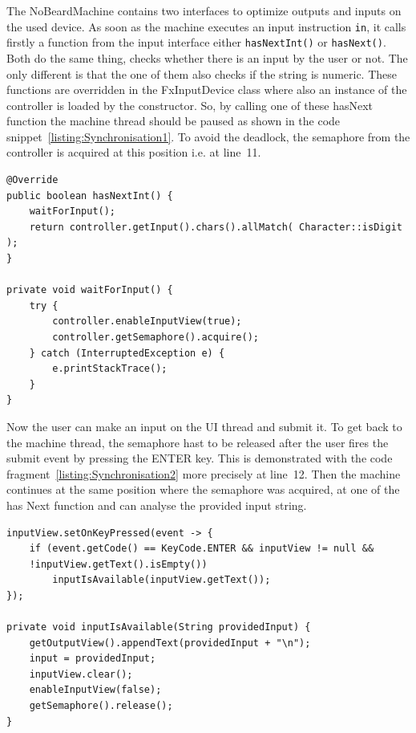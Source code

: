 The NoBeardMachine contains two interfaces to optimize outputs and inputs on the used device. As soon as the machine executes an input instruction \lstinline$in$, it calls firstly a function from the input interface either \lstinline$hasNextInt()$ or \lstinline$hasNext()$. Both do the same thing, checks whether there is an input by the user or not. The only different is that the one of them also checks if the string is numeric. These functions are overridden in the FxInputDevice class where also an instance of the controller is loaded by the constructor. So, by calling one of these hasNext function the machine thread should be paused as shown in the code snippet~\ref{listing:Synchronisation1}. To avoid the deadlock, the semaphore from the controller is acquired at this position i.e. at line~11.
\begin{lstlisting}[caption={Synchronisation with semaphore (Part 1)},label=listing:Synchronisation1]
@Override
public boolean hasNextInt() {
    waitForInput();
    return controller.getInput().chars().allMatch( Character::isDigit );
}

private void waitForInput() {
    try {
        controller.enableInputView(true);
        controller.getSemaphore().acquire();
    } catch (InterruptedException e) {
        e.printStackTrace();
    }
}
\end{lstlisting}
Now the user can make an input on the UI thread and submit it. To get back to the machine thread, the semaphore hast to be released after the user fires the submit event by pressing the ENTER key. This is demonstrated with the code fragment~\ref{listing:Synchronisation2} more precisely at line~12. Then the machine continues at the same position where the semaphore was acquired, at one of the has Next function and can analyse the provided input string.
\begin{lstlisting}[caption={Synchronisation with semaphore (Part 2)},label=listing:Synchronisation2]
inputView.setOnKeyPressed(event -> {
    if (event.getCode() == KeyCode.ENTER && inputView != null && 
    !inputView.getText().isEmpty())
        inputIsAvailable(inputView.getText());
});

private void inputIsAvailable(String providedInput) {
    getOutputView().appendText(providedInput + "\n");
    input = providedInput;
    inputView.clear();
    enableInputView(false);
    getSemaphore().release();
}
\end{lstlisting}
